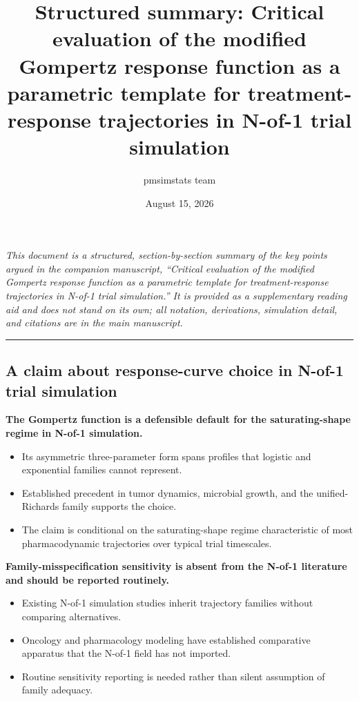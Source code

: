 \documentclass[
  11pt,
]{article}
\title{Structured summary: Critical evaluation of the modified Gompertz response function as a parametric template for treatment-response trajectories in N-of-1 trial simulation}
\author{pmsimstats team}
\date{August 15, 2026}
\begin{document}
\maketitle

{
\setcounter{tocdepth}{2}
\tableofcontents
}
\emph{This document is a structured, section-by-section summary of the key points argued in the companion manuscript, ``Critical evaluation of the modified Gompertz response function as a parametric template for treatment-response trajectories in N-of-1 trial simulation.'' It is provided as a supplementary reading aid and does not stand on its own; all notation, derivations, simulation detail, and citations are in the main manuscript.}

\bigskip\noindent

\rule{\textwidth}{0.4pt}\bigskip

\subsection{A claim about response-curve choice in N-of-1 trial simulation}\label{a-claim-about-response-curve-choice-in-n-of-1-trial-simulation}

\textbf{The Gompertz function is a defensible default for the
saturating-shape regime in N-of-1 simulation.}

\begin{itemize}\setlength{\itemsep}{2pt}\setlength{\parskip}{0pt}
\item Its asymmetric three-parameter form spans profiles that
  logistic and exponential families cannot represent.
\item Established precedent in tumor dynamics, microbial
  growth, and the unified-Richards family supports the choice.
\item The claim is conditional on the saturating-shape regime
  characteristic of most pharmacodynamic trajectories over
  typical trial timescales.
\end{itemize}

\textbf{Family-misspecification sensitivity is absent from the
N-of-1 literature and should be reported routinely.}

\begin{itemize}\setlength{\itemsep}{2pt}\setlength{\parskip}{0pt}
\item Existing N-of-1 simulation studies inherit trajectory
  families without comparing alternatives.
\item Oncology and pharmacology modeling have established
  comparative apparatus that the N-of-1 field has not imported.
\item Routine sensitivity reporting is needed rather than
  silent assumption of family adequacy.
\end{itemize}
\end{document}

